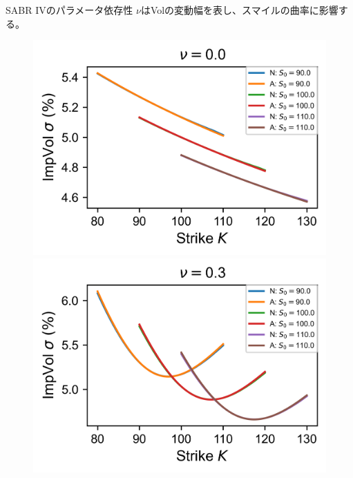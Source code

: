 \documentclass[dvipdfmx,9pt]{beamer}
\begin{document}
\begin{frame}{SABR IVのパラメータ依存性}
  $\nu$はVolの変動幅を表し、スマイルの曲率に影響する。
  \begin{figure}
    \begin{minipage}[b]{0.48\linewidth}
      \raggedleft
      \includegraphics[width=0.7\linewidth]{image/volvol/SABR_graph_0.0.png}
    \end{minipage}
    \hfill
    \begin{minipage}[b]{0.48\linewidth}
      \raggedright
      \includegraphics[width=0.7\linewidth]{image/volvol/SABR_graph_0.3.png}
    \end{minipage}
  \end{figure}


\end{frame}
\end{document}
